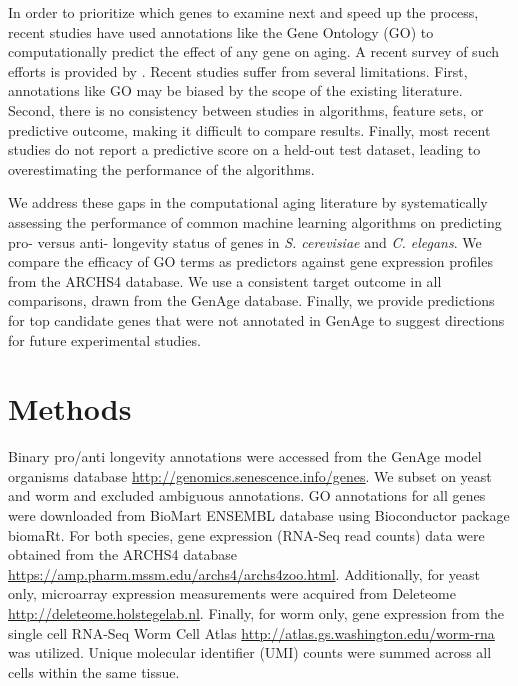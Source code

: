 \documentclass{article}
\begin{document}
In order to prioritize which genes to examine next and speed up the process, recent studies have used annotations like the Gene Ontology (GO) to computationally predict the effect of any gene on aging. A recent survey of such efforts is provided by \cite{fabris_review_2017}. Recent studies suffer from several limitations. First, annotations like GO may be biased by the scope of the existing literature. Second, there is no consistency between studies in algorithms, feature sets, or predictive outcome, making it difficult to compare results. Finally, most recent studies do not report a predictive score on a held-out test dataset, leading to overestimating the performance of the algorithms.

We address these gaps in the computational aging literature by systematically assessing the performance of common machine learning algorithms on predicting pro- versus anti- longevity status of genes in \textit{S. cerevisiae} and \textit{C. elegans}. We compare the efficacy of GO terms as predictors against gene expression profiles from the ARCHS4 database. We use a consistent target outcome in all comparisons, drawn from the GenAge database. Finally, we provide predictions for top candidate genes that were not annotated in GenAge to suggest directions for future experimental studies.

\section{Methods}

Binary pro/anti longevity annotations were accessed from the GenAge model organisms database \url{http://genomics.senescence.info/genes}. We subset on yeast and worm and excluded ambiguous annotations. GO annotations for all genes were downloaded from BioMart ENSEMBL database using Bioconductor package biomaRt. For both species, gene expression (RNA-Seq read counts) data were obtained from the ARCHS4 database \url{https://amp.pharm.mssm.edu/archs4/archs4zoo.html}. Additionally, for yeast only, microarray expression measurements were acquired from Deleteome \url{http://deleteome.holstegelab.nl}. Finally, for worm only, gene expression from the single cell RNA-Seq Worm Cell Atlas \url{http://atlas.gs.washington.edu/worm-rna} was utilized. Unique molecular identifier (UMI) counts were summed across all cells within the same tissue.
\end{document}
